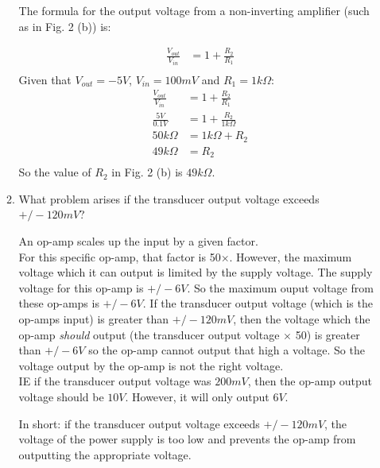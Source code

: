 \documentclass[10pt,\jkfside,a4paper]{article}
\begin{document}
\begin{enumerate}
\begin{enumerate}
The formula for the output voltage from a non-inverting amplifier (such as in Fig. 2 (b)) is:
\begin{center}
\begin{equation}
\begin{split}
\frac{V_{out}}{V_{in}} &= 1 + \frac{R_2}{R_1}\\
\end{split}
\end{equation}
Given that $V_{out} = -5V$, $V_{in} = 100mV$ and $R_1 = 1k\Omega$:
\begin{equation}
\begin{split}
\frac{V_{out}}{V_{in}} &= 1 + \frac{R_2}{R_1}\\
\frac{5V}{0.1V} &= 1 + \frac{R_2}{1k\Omega}\\
50k\Omega &= 1k\Omega + R_2\\
49k\Omega &= R_2\\
\end{split}
\end{equation}
So the value of $R_2$ in Fig. 2 (b) is $49k\Omega$.
\end{center}

\item{What problem arises if the transducer output voltage exceeds $+/-120mV$?}

An op-amp scales up the input by a given factor.\\
For this specific op-amp, that factor is 50$\times$. However, the maximum voltage which 
it can output is limited by the supply voltage. The supply voltage for this 
op-amp is $+/-6V$. So the maximum ouput voltage from these op-amps is $+/-6V$. 
If the transducer output voltage (which is the op-amps input) is greater 
than $+/-120mV$, then the voltage which the op-amp \textit{should} output 
(the transducer output voltage $\times$ 50) is greater than $+/-6V$ so 
the op-amp cannot output that high a voltage. So the voltage output by the 
op-amp is not the right voltage.\\
IE if the transducer output voltage was $200mV$, then the op-amp output voltage 
should be $10V$. However, it will only output $6V$.

In short: if the transducer output voltage exceeds $+/-120mV$, the voltage of the 
power supply is too low and prevents the op-amp from outputting the appropriate voltage.

\end{enumerate}

\end{enumerate}
\end{document}
